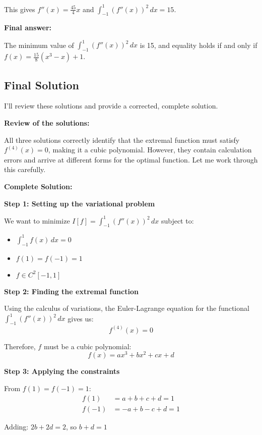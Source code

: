 \documentclass[12pt,a4paper]{article}
\theoremstyle{definition}
\begin{document}
        This gives $f''(x) = \frac{45}{4}x$ and $\int_{-1}^{1} (f''(x))^2\,dx = 15$.

        \textbf{Final answer:}

        The minimum value of $\int_{-1}^{1} (f''(x))^2\,dx$ is 15, and equality holds if and only if $f(x) = \frac{15}{8}(x^3 - x) + 1$.

\subsection{Final Solution}
        I'll review these solutions and provide a corrected, complete solution.

        \textbf{Review of the solutions:}

        All three solutions correctly identify that the extremal function must satisfy $f^{(4)}(x) = 0$, making it a cubic polynomial. However, they contain calculation errors and arrive at different forms for the optimal function. Let me work through this carefully.

        \textbf{Complete Solution:}

        \textbf{Step 1: Setting up the variational problem}

        We want to minimize $I[f] = \int_{-1}^{1} (f''(x))^2 \, dx$ subject to:
        \begin{itemize}
            \item $\int_{-1}^{1} f(x) \, dx = 0$
            \item $f(1) = f(-1) = 1$
            \item $f \in C^2[-1,1]$
        \end{itemize}

        \textbf{Step 2: Finding the extremal function}

        Using the calculus of variations, the Euler-Lagrange equation for the functional $\int_{-1}^{1} (f''(x))^2 \, dx$ gives us:
        $$f^{(4)}(x) = 0$$

        Therefore, $f$ must be a cubic polynomial:
        $$f(x) = ax^3 + bx^2 + cx + d$$

        \textbf{Step 3: Applying the constraints}

        From $f(1) = f(-1) = 1$:
        \begin{align}
            f(1) &= a + b + c + d = 1 \\
            f(-1) &= -a + b - c + d = 1
        \end{align}

        Adding: $2b + 2d = 2$, so $b + d = 1$
\end{document}
